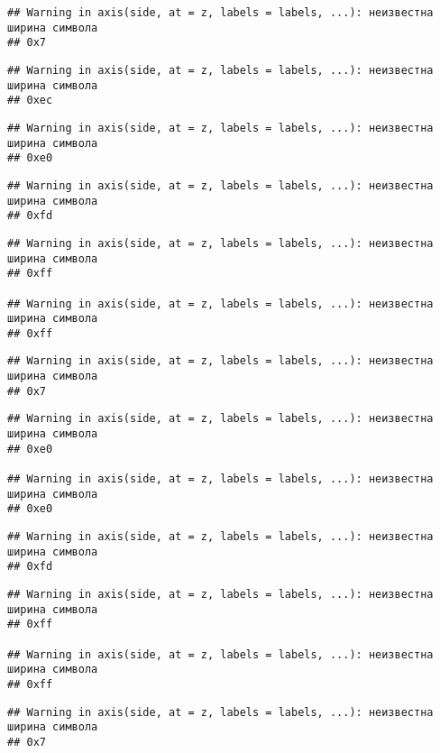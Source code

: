 \documentclass[
]{article}
\begin{document}
\begin{verbatim}
## Warning in axis(side, at = z, labels = labels, ...): неизвестна ширина символа
## 0x7
\end{verbatim}

\begin{verbatim}
## Warning in axis(side, at = z, labels = labels, ...): неизвестна ширина символа
## 0xec
\end{verbatim}

\begin{verbatim}
## Warning in axis(side, at = z, labels = labels, ...): неизвестна ширина символа
## 0xe0
\end{verbatim}

\begin{verbatim}
## Warning in axis(side, at = z, labels = labels, ...): неизвестна ширина символа
## 0xfd
\end{verbatim}

\begin{verbatim}
## Warning in axis(side, at = z, labels = labels, ...): неизвестна ширина символа
## 0xff

## Warning in axis(side, at = z, labels = labels, ...): неизвестна ширина символа
## 0xff
\end{verbatim}

\begin{verbatim}
## Warning in axis(side, at = z, labels = labels, ...): неизвестна ширина символа
## 0x7
\end{verbatim}

\begin{verbatim}
## Warning in axis(side, at = z, labels = labels, ...): неизвестна ширина символа
## 0xe0

## Warning in axis(side, at = z, labels = labels, ...): неизвестна ширина символа
## 0xe0
\end{verbatim}

\begin{verbatim}
## Warning in axis(side, at = z, labels = labels, ...): неизвестна ширина символа
## 0xfd
\end{verbatim}

\begin{verbatim}
## Warning in axis(side, at = z, labels = labels, ...): неизвестна ширина символа
## 0xff

## Warning in axis(side, at = z, labels = labels, ...): неизвестна ширина символа
## 0xff
\end{verbatim}

\begin{verbatim}
## Warning in axis(side, at = z, labels = labels, ...): неизвестна ширина символа
## 0x7
\end{verbatim}
\end{document}
